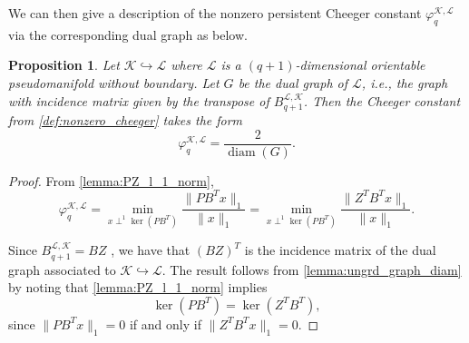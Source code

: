 \documentclass{article}
\newtheorem{proposition}{Proposition}[section]
\newcommand{\KK}{\mathcal{K}}
\newcommand{\LL}{\mathcal{L}}
\newcommand{\diam}{\operatorname{diam}}
\begin{document}
We can then give a description of the nonzero persistent Cheeger constant $\varphi_{q}^{\KK, \LL}$ via the corresponding dual graph as below.

\begin{proposition}\label{prop:pers_cheeger_nbrch_clsd}
Let $\KK\hookrightarrow \LL$ where $\LL$ is a $(q+1)$-dimensional orientable pseudomanifold without boundary. Let $G$ be the dual graph of $\LL$, i.e., the graph with incidence matrix given by the transpose of $B_{q+1}^{\LL, \KK}$. Then the Cheeger constant from \cref{def:nonzero_cheeger} takes the form 
\begin{equation}\label{eq:cheeger_clsd_non_branching}
\varphi_{q}^{\KK, \LL}
=\frac{2}{\diam(G)}.
\end{equation}
\end{proposition}

\begin{proof}
From \cref{lemma:PZ_l_1_norm},
 \[
 \varphi_{q}^{\KK, \LL}
    =
    \min_{x\perp^1\ker(PB^T)}\frac{\|PB^Tx\|_1}{\|x\|_1}
    =
    \min_{x\perp^1\ker(PB^T)}\frac{\|Z^TB^Tx\|_1}{\|x\|_1}.
    \]

Since $B_{q+1}^{\LL,\KK} = BZ$ \cite[Lemma 3.4]{pers_lap}, we have that $(BZ)^T$ is the incidence matrix of the dual graph associated to $\KK\hookrightarrow \LL$. The result follows from \cref{lemma:ungrd_graph_diam} by noting that \cref{lemma:PZ_l_1_norm} implies
\[
    \ker(PB^T)=\ker(Z^TB^T),
\]
since \(\|PB^Tx\|_1=0\) if and only if
\(\|Z^TB^Tx\|_1=0\). 
\end{proof}
\end{document}

